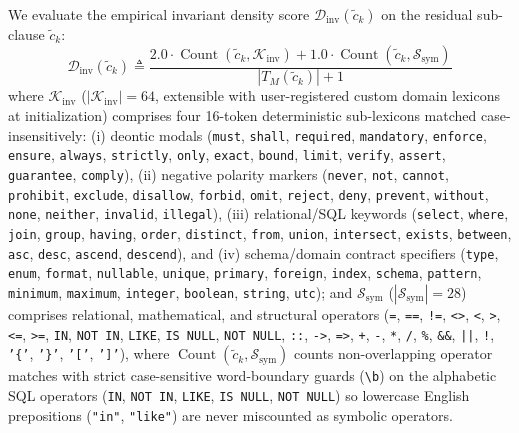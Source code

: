 \documentclass[conference,10pt]{IEEEtran}
\begin{document}
We evaluate the empirical invariant density score $\mathcal{D}_{\text{inv}}(\tilde{c}_k)$ on the residual sub-clause $\tilde{c}_k$:
\begin{equation}
\label{eq:density_score}
\mathcal{D}_{\text{inv}}(\tilde{c}_k) \triangleq \frac{2.0 \cdot \operatorname{Count}(\tilde{c}_k, \mathcal{K}_{\text{inv}}) + 1.0 \cdot \operatorname{Count}(\tilde{c}_k, \mathcal{S}_{\text{sym}})}{|T_M(\tilde{c}_k)| + 1}
\end{equation}
where $\mathcal{K}_{\text{inv}}$ ($|\mathcal{K}_{\text{inv}}| = 64$, extensible with user-registered custom domain lexicons at initialization) comprises four 16-token deterministic sub-lexicons matched case-insensitively: (i) deontic modals (\texttt{must}, \texttt{shall}, \texttt{required}, \texttt{mandatory}, \texttt{enforce}, \texttt{ensure}, \texttt{always}, \texttt{strictly}, \texttt{only}, \texttt{exact}, \texttt{bound}, \texttt{limit}, \texttt{verify}, \texttt{assert}, \texttt{guarantee}, \texttt{comply}), (ii) negative polarity markers (\texttt{never}, \texttt{not}, \texttt{cannot}, \texttt{prohibit}, \texttt{exclude}, \texttt{disallow}, \texttt{forbid}, \texttt{omit}, \texttt{reject}, \texttt{deny}, \texttt{prevent}, \texttt{without}, \texttt{none}, \texttt{neither}, \texttt{invalid}, \texttt{illegal}), (iii) relational/SQL keywords (\texttt{select}, \texttt{where}, \texttt{join}, \texttt{group}, \texttt{having}, \texttt{order}, \texttt{distinct}, \texttt{from}, \texttt{union}, \texttt{intersect}, \texttt{exists}, \texttt{between}, \texttt{asc}, \texttt{desc}, \texttt{ascend}, \texttt{descend}), and (iv) schema/domain contract specifiers (\texttt{type}, \texttt{enum}, \texttt{format}, \texttt{nullable}, \texttt{unique}, \texttt{primary}, \texttt{foreign}, \texttt{index}, \texttt{schema}, \texttt{pattern}, \texttt{minimum}, \texttt{maximum}, \texttt{integer}, \texttt{boolean}, \texttt{string}, \texttt{utc}); and $\mathcal{S}_{\text{sym}}$ ($|\mathcal{S}_{\text{sym}}| = 28$) comprises relational, mathematical, and structural operators (\texttt{=}, \texttt{==}, \texttt{!=}, \texttt{<>}, \texttt{<}, \texttt{>}, \texttt{<=}, \texttt{>=}, \texttt{IN}, \texttt{NOT IN}, \texttt{LIKE}, \texttt{IS NULL}, \texttt{NOT NULL}, \texttt{::}, \texttt{->}, \texttt{=>}, \texttt{+}, \texttt{-}, \texttt{*}, \texttt{/}, \texttt{\%}, \texttt{\&\&}, \texttt{||}, \texttt{!}, \texttt{'\{'}, \texttt{'\}'}, \texttt{'['}, \texttt{']'}), where $\operatorname{Count}(\tilde{c}_k, \mathcal{S}_{\text{sym}})$ counts non-overlapping operator matches with strict case-sensitive word-boundary guards (\texttt{\textbackslash b}) on the alphabetic SQL operators (\texttt{IN}, \texttt{NOT IN}, \texttt{LIKE}, \texttt{IS NULL}, \texttt{NOT NULL}) so lowercase English prepositions (\texttt{"in"}, \texttt{"like"}) are never miscounted as symbolic operators.
\end{document}
